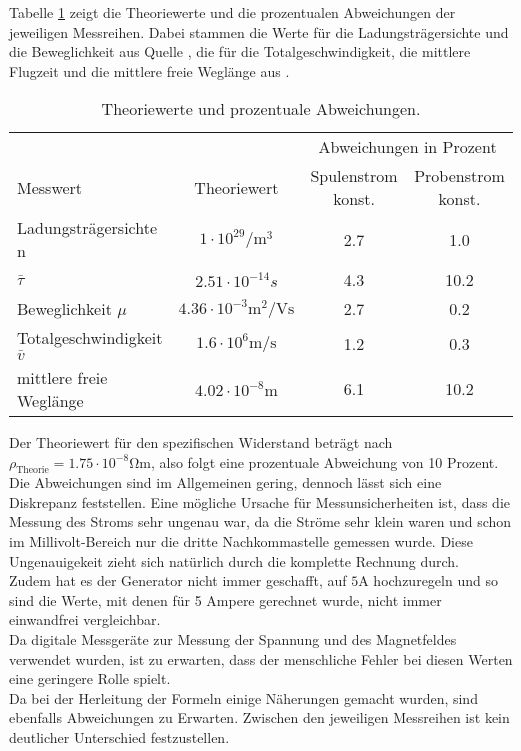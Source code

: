 Tabelle \ref{tab:theo} zeigt die Theoriewerte und die prozentualen Abweichungen 
der jeweiligen Messreihen. Dabei stammen die Werte für die Ladungsträgersichte und
die Beweglichkeit aus Quelle \cite{beweglichkeit}, die für die Totalgeschwindigkeit,
die mittlere Flugzeit und die mittlere freie Weglänge aus \cite{transport}. 
\begin{table}[H]
 \centering
 \caption{Theoriewerte und prozentuale Abweichungen.}
 \label{tab:theo}
 \begin{tabular}{lccc}
  \toprule
   & & \multicolumn{2}{c}{Abweichungen in Prozent}\\
  \cmidrule(lr){3-4}
  Messwert & Theoriewert & Spulenstrom konst. & Probenstrom konst. \\
  \midrule
  Ladungsträgersichte n & $1 \cdot 10^{29} \si{\per\m\cubed}$ & 2.7 & 1.0\\
  $\bar{\tau}$ & $2.51 \cdot 10^{-14} \si{s}$ & 4.3 & 10.2\\
  Beweglichkeit $\mu$ & $4.36 \cdot 10^{-3} \si{\m\squared\per\volt\s}$ & 2.7 & 0.2 \\
  Totalgeschwindigkeit $\bar{v}$ & $1.6 \cdot 10^{6} \si{\m\per\s}$ & 1.2 & 0.3 \\
  mittlere freie Weglänge & $4.02 \cdot 10^{-8} \si{\m}$ & 6.1 & 10.2 \\
  \bottomrule
 \end{tabular}
\end{table}
\noindent Der Theoriewert für den spezifischen Widerstand beträgt nach \cite{spezid} 
$\rho_\text{Theorie} = 1.75 \cdot 10^{-8} \si{\ohm\m}$, also folgt eine prozentuale 
Abweichung von 10 Prozent.\\
Die Abweichungen sind im Allgemeinen gering, dennoch lässt sich eine Diskrepanz feststellen.
Eine mögliche Ursache für Messunsicherheiten ist, dass die Messung des Stroms sehr ungenau
war, da die Ströme sehr klein waren und schon im Millivolt-Bereich nur 
die dritte Nachkommastelle gemessen wurde. Diese Ungenauigekeit zieht sich
natürlich durch die komplette Rechnung durch.\\
Zudem hat es der Generator nicht immer geschafft, auf $5 \si{\A}$ hochzuregeln
und so sind die Werte, mit denen für 5 Ampere gerechnet wurde, nicht immer einwandfrei
vergleichbar. \\
Da digitale Messgeräte zur Messung der Spannung und des Magnetfeldes verwendet
wurden, ist zu erwarten, dass der menschliche Fehler bei diesen Werten eine geringere
Rolle spielt.\\
Da bei der Herleitung der Formeln einige Näherungen gemacht wurden, sind ebenfalls
Abweichungen zu Erwarten.
Zwischen den jeweiligen Messreihen ist kein deutlicher Unterschied festzustellen.